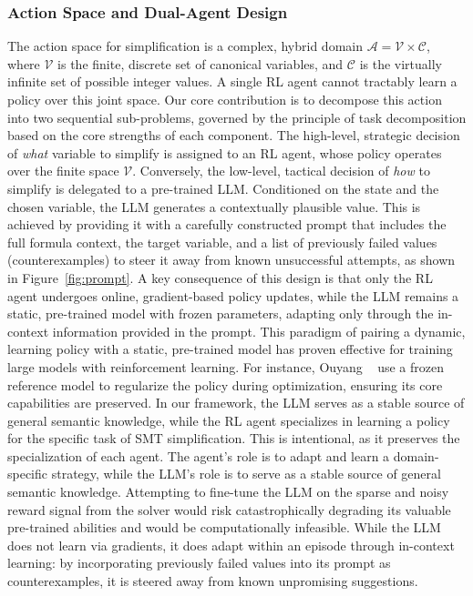 \subsubsection{Action Space and Dual-Agent Design}
The action space for simplification is a complex, hybrid domain $\mathcal{A} = \mathcal{V} \times \mathcal{C}$, where $\mathcal{V}$ is the finite, discrete set of canonical variables, and $\mathcal{C}$ is the virtually infinite set of possible integer values. A single RL agent cannot tractably learn a policy over this joint space.
Our core contribution is to decompose this action into two sequential sub-problems, governed by the principle of task decomposition based on the core strengths of each component\cite{kautz2022third}. The high-level, strategic decision of \textit{what} variable to simplify is assigned to an RL agent, whose policy operates over the finite space $\mathcal{V}$. Conversely, the low-level, tactical decision of \textit{how} to simplify is delegated to a pre-trained LLM. Conditioned on the state and the chosen variable, the LLM generates a contextually plausible value. This is achieved by providing it with a carefully constructed prompt that includes the full formula context, the target variable, and a list of previously failed values (counterexamples) to steer it away from known unsuccessful attempts, as shown in Figure~\ref{fig:prompt}. 
A key consequence of this design is that only the RL agent undergoes online, gradient-based policy updates, while the LLM remains a static, pre-trained model with frozen parameters, adapting only through the in-context information provided in the prompt. This paradigm of pairing a dynamic, learning policy with a static, pre-trained model has proven effective for training large models with reinforcement learning. For instance, Ouyang \etal~\cite{ouyang2022training} use a frozen reference model to regularize the policy during optimization, ensuring its core capabilities are preserved. In our framework, the LLM serves as a stable source of general semantic knowledge, while the RL agent specializes in learning a policy for the specific task of SMT simplification.
This is intentional, as it preserves the specialization of each agent. The \RL{} agent's role is to adapt and learn a domain-specific strategy, while the LLM's role is to serve as a stable source of general semantic knowledge. Attempting to fine-tune the LLM on the sparse and noisy reward signal from the solver would risk catastrophically degrading its valuable pre-trained abilities and would be computationally infeasible. While the LLM does not learn via gradients, it does adapt within an episode through in-context learning: by incorporating previously failed values into its prompt as counterexamples, it is steered away from known unpromising suggestions.

